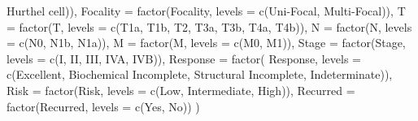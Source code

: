 \documentclass[
  letterpaper,
  DIV=11,
  numbers=noendperiod]{scrartcl}
\newenvironment{Shaded}{\begin{snugshade}}{\end{snugshade}}
\newcommand{\AttributeTok}[1]{\textcolor[rgb]{0.40,0.45,0.13}{#1}}
\newcommand{\FunctionTok}[1]{\textcolor[rgb]{0.28,0.35,0.67}{#1}}
\newcommand{\NormalTok}[1]{\textcolor[rgb]{0.00,0.23,0.31}{#1}}
\newcommand{\OtherTok}[1]{\textcolor[rgb]{0.00,0.23,0.31}{#1}}
\newcommand{\StringTok}[1]{\textcolor[rgb]{0.13,0.47,0.30}{#1}}
\begin{document}
\begin{Shaded}
\begin{Highlighting}[]
                 \StringTok{\textquotesingle{}Hurthel cell\textquotesingle{}}\NormalTok{)),}
    \AttributeTok{Focality =} \FunctionTok{factor}\NormalTok{(Focality, }\AttributeTok{levels =} \FunctionTok{c}\NormalTok{(}\StringTok{\textquotesingle{}Uni{-}Focal\textquotesingle{}}\NormalTok{, }\StringTok{\textquotesingle{}Multi{-}Focal\textquotesingle{}}\NormalTok{)),}
    \StringTok{\textasciigrave{}}\AttributeTok{T}\StringTok{\textasciigrave{}} \OtherTok{=} \FunctionTok{factor}\NormalTok{(}\StringTok{\textasciigrave{}}\AttributeTok{T}\StringTok{\textasciigrave{}}\NormalTok{, }\AttributeTok{levels =} \FunctionTok{c}\NormalTok{(}\StringTok{\textquotesingle{}T1a\textquotesingle{}}\NormalTok{, }\StringTok{\textquotesingle{}T1b\textquotesingle{}}\NormalTok{, }\StringTok{\textquotesingle{}T2\textquotesingle{}}\NormalTok{, }\StringTok{\textquotesingle{}T3a\textquotesingle{}}\NormalTok{, }\StringTok{\textquotesingle{}T3b\textquotesingle{}}\NormalTok{, }\StringTok{\textquotesingle{}T4a\textquotesingle{}}\NormalTok{,}
                                 \StringTok{\textquotesingle{}T4b\textquotesingle{}}\NormalTok{)),}
    \AttributeTok{N =} \FunctionTok{factor}\NormalTok{(N, }\AttributeTok{levels =} \FunctionTok{c}\NormalTok{(}\StringTok{\textquotesingle{}N0\textquotesingle{}}\NormalTok{, }\StringTok{\textquotesingle{}N1b\textquotesingle{}}\NormalTok{, }\StringTok{\textquotesingle{}N1a\textquotesingle{}}\NormalTok{)),}
    \AttributeTok{M =} \FunctionTok{factor}\NormalTok{(M, }\AttributeTok{levels =} \FunctionTok{c}\NormalTok{(}\StringTok{\textquotesingle{}M0\textquotesingle{}}\NormalTok{, }\StringTok{\textquotesingle{}M1\textquotesingle{}}\NormalTok{)),}
    \AttributeTok{Stage =} \FunctionTok{factor}\NormalTok{(Stage, }\AttributeTok{levels =} \FunctionTok{c}\NormalTok{(}\StringTok{\textquotesingle{}I\textquotesingle{}}\NormalTok{, }\StringTok{\textquotesingle{}II\textquotesingle{}}\NormalTok{, }\StringTok{\textquotesingle{}III\textquotesingle{}}\NormalTok{, }\StringTok{\textquotesingle{}IVA\textquotesingle{}}\NormalTok{, }\StringTok{\textquotesingle{}IVB\textquotesingle{}}\NormalTok{)),}
    \AttributeTok{Response =} \FunctionTok{factor}\NormalTok{(}
\NormalTok{      Response,}
      \AttributeTok{levels =} \FunctionTok{c}\NormalTok{(}\StringTok{\textquotesingle{}Excellent\textquotesingle{}}\NormalTok{, }\StringTok{\textquotesingle{}Biochemical Incomplete\textquotesingle{}}\NormalTok{,}
                 \StringTok{\textquotesingle{}Structural Incomplete\textquotesingle{}}\NormalTok{, }\StringTok{\textquotesingle{}Indeterminate\textquotesingle{}}\NormalTok{)),}
    \AttributeTok{Risk =} \FunctionTok{factor}\NormalTok{(Risk, }\AttributeTok{levels =} \FunctionTok{c}\NormalTok{(}\StringTok{\textquotesingle{}Low\textquotesingle{}}\NormalTok{, }\StringTok{\textquotesingle{}Intermediate\textquotesingle{}}\NormalTok{, }\StringTok{\textquotesingle{}High\textquotesingle{}}\NormalTok{)),}
    \AttributeTok{Recurred =} \FunctionTok{factor}\NormalTok{(Recurred, }\AttributeTok{levels =} \FunctionTok{c}\NormalTok{(}\StringTok{\textquotesingle{}Yes\textquotesingle{}}\NormalTok{, }\StringTok{\textquotesingle{}No\textquotesingle{}}\NormalTok{))}
\NormalTok{  )}
\end{Highlighting}
\end{Shaded}
\end{document}
